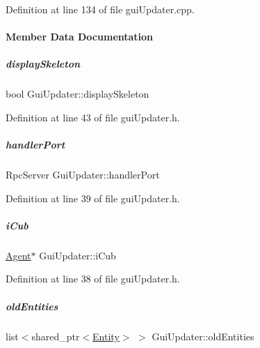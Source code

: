 Definition at line 134 of file gui\+Updater.\+cpp.



\paragraph{Member Data Documentation}
\mbox{\label{group__guiUpdater_a4abe8ed2ee23b60de94d4055e90ef0aa}} 
\subparagraph{\texorpdfstring{display\+Skeleton}{displaySkeleton}}
{\footnotesize\ttfamily bool Gui\+Updater\+::display\+Skeleton\hspace{0.3cm}{\ttfamily [protected]}}



Definition at line 43 of file gui\+Updater.\+h.

\mbox{\label{group__guiUpdater_adb0e6936ecb65372a44aef8efe9cb2ad}} 
\subparagraph{\texorpdfstring{handler\+Port}{handlerPort}}
{\footnotesize\ttfamily Rpc\+Server Gui\+Updater\+::handler\+Port\hspace{0.3cm}{\ttfamily [protected]}}



Definition at line 39 of file gui\+Updater.\+h.

\mbox{\label{group__guiUpdater_aa941eaa4ca5e07d0ea0fccc00a5f230a}} 
\subparagraph{\texorpdfstring{i\+Cub}{iCub}}
{\footnotesize\ttfamily \hyperlink{group__icubclient__representations_classicubclient_1_1Agent}{Agent}$\ast$ Gui\+Updater\+::i\+Cub\hspace{0.3cm}{\ttfamily [protected]}}



Definition at line 38 of file gui\+Updater.\+h.

\mbox{\label{group__guiUpdater_a44a33363b01d8799a3d48c9c0b14b200}} 
\subparagraph{\texorpdfstring{old\+Entities}{oldEntities}}
{\footnotesize\ttfamily list$<$shared\+\_\+ptr$<$\hyperlink{group__icubclient__representations_classicubclient_1_1Entity}{Entity}$>$ $>$ Gui\+Updater\+::old\+Entities\hspace{0.3cm}{\ttfamily [protected]}}



